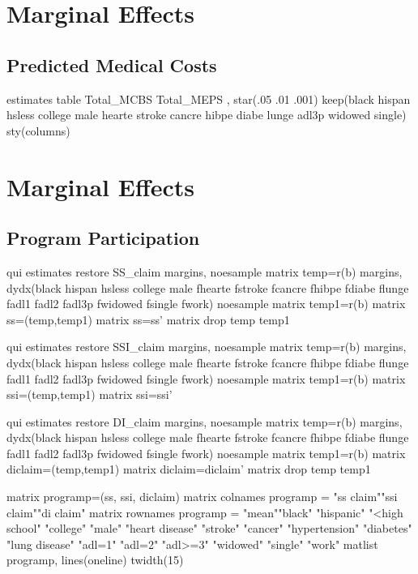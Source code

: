 \documentclass{article}
\begin{document}
\pagebreak
\section*{\centering Marginal Effects}
\subsection*{\centering Predicted Medical Costs}
\begin{Statacode} 
estimates table Total_MCBS Total_MEPS , star(.05 .01 .001) keep(black hispan hsless college male hearte stroke cancre hibpe diabe lunge adl3p widowed single) sty(columns)
\end{Statacode}

\pagebreak
\section*{\centering Marginal Effects}
\subsection*{\centering Program Participation}
\begin{Statacode}

qui estimates restore SS_claim
margins, noesample
matrix temp=r(b)
margins, dydx(black hispan hsless college male fhearte fstroke fcancre fhibpe fdiabe flunge fadl1 fadl2 fadl3p fwidowed fsingle fwork) noesample
matrix temp1=r(b)
matrix ss=(temp,temp1)
matrix ss=ss'
matrix drop temp temp1

qui estimates restore SSI_claim
margins, noesample
matrix temp=r(b)
margins, dydx(black hispan hsless college male fhearte fstroke fcancre fhibpe fdiabe flunge fadl1 fadl2 fadl3p fwidowed fsingle fwork) noesample
matrix temp1=r(b)
matrix ssi=(temp,temp1)
matrix ssi=ssi'

qui estimates restore DI_claim
margins, noesample
matrix temp=r(b)
margins, dydx(black hispan hsless college male fhearte fstroke fcancre fhibpe fdiabe flunge fadl1 fadl2 fadl3p fwidowed fsingle fwork) noesample
matrix temp1=r(b)
matrix diclaim=(temp,temp1)
matrix diclaim=diclaim'
matrix drop temp temp1

matrix programp=(ss, ssi, diclaim)
matrix colnames programp = "ss claim""ssi claim""di claim"
matrix rownames programp = "mean""black" "hispanic" "<high school" "college" "male" "heart disease" "stroke" "cancer" "hypertension" "diabetes" "lung disease" "adl=1" "adl=2" "adl>=3" "widowed" "single" "work"
matlist programp, lines(oneline) twidth(15)  

\end{Statacode}
\end{document}
